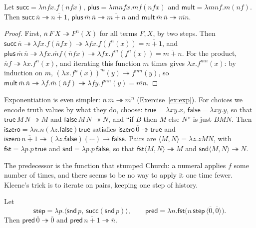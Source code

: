 \begin{proposition}\label{prop:arith}
Let $\mathsf{succ}=\lambda nfx.f(nfx)$, $\mathsf{plus}=\lambda mnfx.mf(nfx)$ and $\mathsf{mult}=\lambda mnf.m(nf)$. Then $\mathsf{succ}\,\overline n\twoheadrightarrow\overline{n+1}$, $\mathsf{plus}\,\overline m\,\overline n\twoheadrightarrow\overline{m+n}$ and $\mathsf{mult}\,\overline m\,\overline n\twoheadrightarrow\overline{mn}$.
\end{proposition}

\begin{proof}
First, $\overline n\,F\,X\twoheadrightarrow F^n(X)$ for all terms $F,X$, by two steps. Then $\mathsf{succ}\,\overline n\twoheadrightarrow\lambda fx.f(\overline nfx)\twoheadrightarrow\lambda fx.f(f^n(x))=\overline{n+1}$, and $\mathsf{plus}\,\overline m\,\overline n\twoheadrightarrow\lambda fx.\overline mf(\overline nfx)\twoheadrightarrow\lambda fx.f^m(f^n(x))=\overline{m+n}$. For the product, $\overline n f\twoheadrightarrow\lambda x.f^n(x)$, and iterating this function $m$ times gives $\lambda x.f^{mn}(x)$: by induction on $m$, $(\lambda x.f^n(x))^m(y)\twoheadrightarrow f^{mn}(y)$, so $\mathsf{mult}\,\overline m\,\overline n\twoheadrightarrow\lambda f.\overline m(\overline nf)\twoheadrightarrow\lambda fy.f^{mn}(y)=\overline{mn}$.
\end{proof}

Exponentiation is even simpler: $\overline n\,\overline m\twoheadrightarrow\overline{m^n}$ (Exercise~\ref{ex:exp}). For choices we encode truth values by what they do, choose: $\mathsf{true}=\lambda xy.x$, $\mathsf{false}=\lambda xy.y$, so that $\mathsf{true}\,M\,N\twoheadrightarrow M$ and $\mathsf{false}\,M\,N\twoheadrightarrow N$, and ``if $B$ then $M$ else $N$'' is just $BMN$. Then $\mathsf{iszero}=\lambda n.n(\lambda z.\mathsf{false})\mathsf{true}$ satisfies $\mathsf{iszero}\,\overline0\twoheadrightarrow\mathsf{true}$ and $\mathsf{iszero}\,\overline{n+1}\twoheadrightarrow(\lambda z.\mathsf{false})(\cdots)\to\mathsf{false}$. Pairs are $\langle M,N\rangle=\lambda z.zMN$, with $\mathsf{fst}=\lambda p.p\,\mathsf{true}$ and $\mathsf{snd}=\lambda p.p\,\mathsf{false}$, so that $\mathsf{fst}\langle M,N\rangle\twoheadrightarrow M$ and $\mathsf{snd}\langle M,N\rangle\twoheadrightarrow N$.

The predecessor is the function that stumped Church: a numeral applies $f$ some number of times, and there seems to be no way to apply it one time fewer. Kleene's trick is to iterate on pairs, keeping one step of history.

\begin{proposition}[Kleene]\label{prop:pred}
Let
\[
\mathsf{step}=\lambda p.\langle\mathsf{snd}\,p,\ \mathsf{succ}(\mathsf{snd}\,p)\rangle,\qquad\mathsf{pred}=\lambda n.\mathsf{fst}\bigl(n\,\mathsf{step}\,\langle\overline0,\overline0\rangle\bigr).
\]
Then $\mathsf{pred}\,\overline0\twoheadrightarrow\overline0$ and $\mathsf{pred}\,\overline{n+1}\twoheadrightarrow\overline n$.
\end{proposition}

